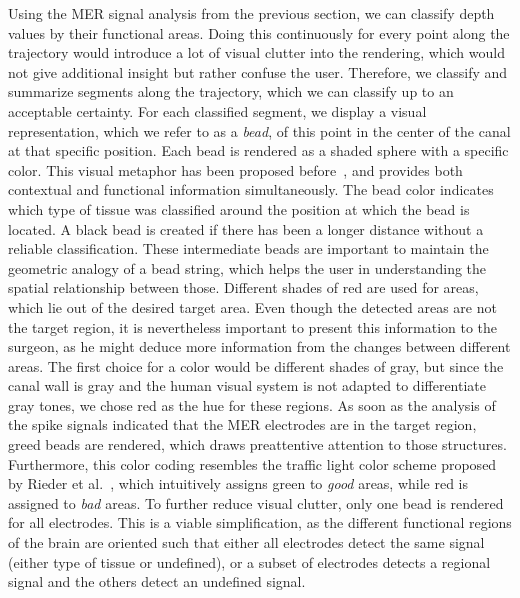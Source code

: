 \documentclass{vgtc}                          %
\begin{document}
Using the MER signal analysis from the previous section, we can classify depth values by their functional areas. Doing this continuously for every point along the trajectory would introduce a lot of visual clutter into the rendering, which would not give additional insight but rather confuse the user. Therefore, we classify and summarize segments along the trajectory, which we can classify up to an acceptable certainty. For each classified segment, we display a visual representation, which we refer to as a \emph{bead}, of this point in the center of the canal at that specific position. Each bead is rendered as a shaded sphere with a specific color. This visual metaphor has been proposed before~\cite{Miocinovic2007,Haese2005}, and provides both contextual and functional information simultaneously. The bead color indicates which type of tissue was classified around the position at which the bead is located. A black bead is created if there has been a longer distance without a reliable classification. These intermediate beads are important to maintain the geometric analogy of a bead string, which helps the user in understanding the spatial relationship between those. Different shades of red are used for areas, which lie out of the desired target area. Even though the detected areas are not the target region, it is nevertheless important to present this information to the surgeon, as he might deduce more information from the changes between different areas. The first choice for a color would be different shades of gray, but since the canal wall is gray and the human visual system is not adapted to differentiate gray tones, we chose red as the hue for these regions. As soon as the analysis of the spike signals  indicated that the MER electrodes are in the target region, greed beads are rendered, which draws preattentive attention to those structures. Furthermore, this color coding resembles the traffic light color scheme proposed by Rieder et al.~\cite{RIEDERREDGREEN}, which intuitively assigns green to {\it good} areas, while red is assigned to {\it bad} areas. To further reduce visual clutter, only one bead is rendered for all electrodes. This is a viable simplification, as the different functional regions of the brain are oriented such that either all electrodes detect the same signal (either type of tissue or undefined), or a subset of electrodes detects a regional signal and the others detect an undefined signal.
\end{document}
